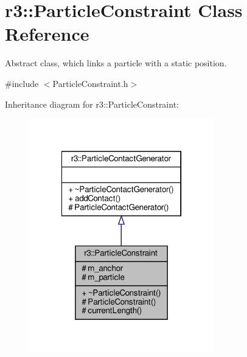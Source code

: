 \hypertarget{classr3_1_1_particle_constraint}{}\section{r3\+:\+:Particle\+Constraint Class Reference}
\label{classr3_1_1_particle_constraint}


Abstract class, which links a particle with a static position.  




{\ttfamily \#include $<$Particle\+Constraint.\+h$>$}



Inheritance diagram for r3\+:\+:Particle\+Constraint\+:\nopagebreak
\begin{figure}[H]
\begin{center}
\leavevmode
\includegraphics[width=227pt]{classr3_1_1_particle_constraint__inherit__graph}
\end{center}
\end{figure}


